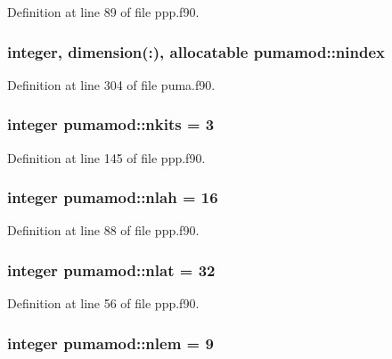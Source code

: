\-Definition at line 89 of file ppp.\-f90.

\hypertarget{classpumamod_a7902698a1673a4c65dd8e7443a7fcc6f}{
\subsubsection[{nindex}]{\setlength{\rightskip}{0pt plus 5cm}integer, dimension(\-:), allocatable {\bf pumamod\-::nindex}}}
\label{classpumamod_a7902698a1673a4c65dd8e7443a7fcc6f}


\-Definition at line 304 of file puma.\-f90.

\hypertarget{classpumamod_ae5867c6d3c10e9065d7b541ca679d112}{
\subsubsection[{nkits}]{\setlength{\rightskip}{0pt plus 5cm}integer {\bf pumamod\-::nkits} = 3}}
\label{classpumamod_ae5867c6d3c10e9065d7b541ca679d112}


\-Definition at line 145 of file ppp.\-f90.

\hypertarget{classpumamod_a6f175a2b93a1284714be362b3a1d6f39}{
\subsubsection[{nlah}]{\setlength{\rightskip}{0pt plus 5cm}integer {\bf pumamod\-::nlah} = 16}}
\label{classpumamod_a6f175a2b93a1284714be362b3a1d6f39}


\-Definition at line 88 of file ppp.\-f90.

\hypertarget{classpumamod_a3411ab6d530e7e20888d7bfbe0f2bc41}{
\subsubsection[{nlat}]{\setlength{\rightskip}{0pt plus 5cm}integer {\bf pumamod\-::nlat} = 32}}
\label{classpumamod_a3411ab6d530e7e20888d7bfbe0f2bc41}


\-Definition at line 56 of file ppp.\-f90.

\hypertarget{classpumamod_a09581b8e97e093efc8ec479657f637bf}{
\subsubsection[{nlem}]{\setlength{\rightskip}{0pt plus 5cm}integer {\bf pumamod\-::nlem} = 9}}
\label{classpumamod_a09581b8e97e093efc8ec479657f637bf}


